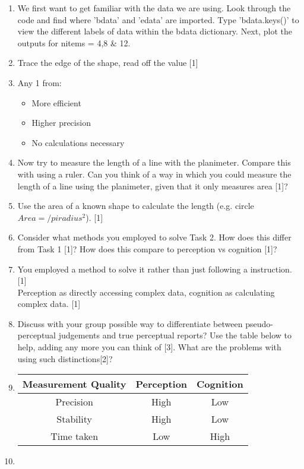 \documentclass[12pt,english]{scrartcl}
\begin{document}
\begin{enumerate}
 \item We first want to get familiar with the data we are using. Look through the code and find where 'bdata' and 'edata' are imported. Type 'bdata.keys()' to view the different labels of data within the bdata dictionary. Next, plot the outputs for nitems = 4,8 & 12.
 
 \item[]
 \color{blue}
 Trace the edge of the shape, read off the value [1] 
 \item[]
 Any 1 from:
 \begin{itemize}
 \item More efficient
 \item Higher precision
 \item No calculations necessary 
 \end{itemize} 
 
 \color{black}
 \item Now try to measure the length of a line with the planimeter. Compare this with using a ruler. Can you think of a way in which you could measure the length of a line using the planimeter, given that it only measures area [1]?
 \item[]
 \color{blue}
 Use the area of a known shape to calculate the length (e.g. circle $Area =/pi radius^2 $). [1]
 
 \color{black}
 \item Consider what methods you employed to solve Task 2. How does this differ from Task 1 [1]? How does this compare to perception vs cognition [1]?
 \item[]
 \color{blue}
 You employed a method to solve it rather than just following a instruction. [1] \\
 Perception as directly accessing complex data, cognition as calculating complex data. [1]
 
 \color{black}
 \item Discuss with your group possible way to differentiate between pseudo-perceptual judgements and true perceptual reports? Use the table below to help, adding any more you can think of [3]. What are the problems with using such distinctions[2]?
 \item[]

  \begin{center}
   \begin{tabular}{ || c c c || } 
   \hline
   Measurement Quality & Perception & Cognition \\ 
   \hline
   Precision & \color{blue} High & \color{blue} Low  \\ 
   \hline
   Stability & \color{blue} High & \color{blue} Low  \\ 
   \hline
   Time taken  & \color{blue} Low  & \color{blue} High \\
   \hline
   \end{tabular}
  \end{center}
  \item[]
  

\end{enumerate}
\end{document}
